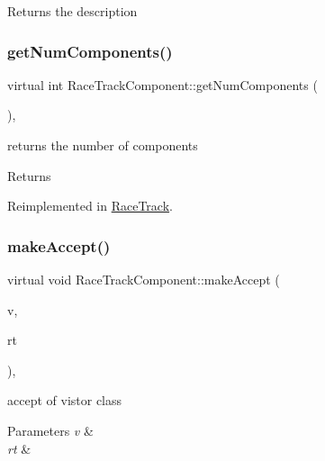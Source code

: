 \begin{DoxyReturn}{Returns}
the description 
\end{DoxyReturn}
\mbox{\label{class_race_track_component_a6b57a071d1f11ddccd416fdbfe7e973b}} 
\subsubsection{\texorpdfstring{get\+Num\+Components()}{getNumComponents()}}
{\footnotesize\ttfamily virtual int Race\+Track\+Component\+::get\+Num\+Components (\begin{DoxyParamCaption}{ }\end{DoxyParamCaption})\hspace{0.3cm}{\ttfamily [inline]}, {\ttfamily [virtual]}}

returns the number of components \begin{DoxyReturn}{Returns}

\end{DoxyReturn}


Reimplemented in \mbox{\hyperlink{class_race_track_a8870f6bafe0fbb3e693405b23dd40016}{Race\+Track}}.

\mbox{\label{class_race_track_component_a7cfe0c366248474e2665d42724c09bca}} 
\subsubsection{\texorpdfstring{make\+Accept()}{makeAccept()}}
{\footnotesize\ttfamily virtual void Race\+Track\+Component\+::make\+Accept (\begin{DoxyParamCaption}\item[{\mbox{\hyperlink{class_big_brother}{Big\+Brother}} $\ast$}]{v,  }\item[{int}]{rt }\end{DoxyParamCaption})\hspace{0.3cm}{\ttfamily [inline]}, {\ttfamily [virtual]}}

accept of vistor class 
\begin{DoxyParams}{Parameters}
{\em v} & \\
\hline
{\em rt} & \\
\hline
\end{DoxyParams}



